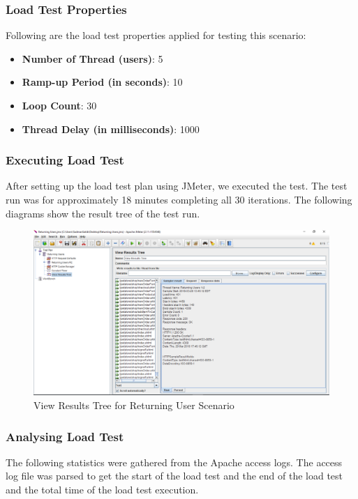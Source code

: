 \documentclass[fontsize=12pt,paper=letter,twoside]{scrartcl}
\begin{document}
\clearpage
\subsubsection{Load Test Properties}
Following are the load test properties applied for testing this scenario:
\begin{itemize}
\item \textbf{Number of Thread (users)}: 5
\item \textbf{Ramp-up Period (in seconds)}: 10
\item \textbf{Loop Count}: 30
\item \textbf{Thread Delay (in milliseconds)}: 1000
\end{itemize}

\subsubsection{Executing Load Test}
After setting up the load test plan using JMeter, we executed the test. The test run was for approximately 18 minutes completing all 30 iterations. The following diagrams show the result tree of the test run.

\begin{figure}[!htb]
\begin{center}
\includegraphics[width=.9\textwidth]{../../load-test/test-plans/returning-user/result-tree.png}
\end{center}
\caption{View Results Tree for Returning User Scenario}
\label{fig:ruser:view_result_tree}
\end{figure}

\subsubsection{Analysing Load Test}
The following statistics were gathered from the Apache access logs. The access log file was parsed to get the start of the load test and the end of the load test and the total time of the load test execution.
\end{document}
